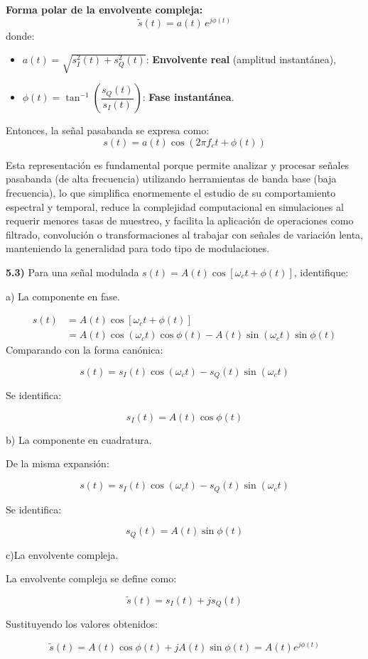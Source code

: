 \noindent \textbf{Forma polar de la envolvente compleja:}
\[
\tilde{s}(t) = a(t) \, e^{j \phi(t)}
\]
donde:
\begin{itemize}
    \item \( a(t) = \sqrt{s_I^2(t) + s_Q^2(t)} \): \textbf{Envolvente real} (amplitud instantánea),
    \item \( \phi(t) = \tan^{-1} \left( \dfrac{s_Q(t)}{s_I(t)} \right) \): \textbf{Fase instantánea}.
\end{itemize}
\noindent Entonces, la señal pasabanda se expresa como:
\[
s(t) = a(t) \cos \left( 2\pi f_c t + \phi(t) \right)
\]

\noindent Esta representación es fundamental porque permite analizar y procesar señales pasabanda (de alta frecuencia) utilizando herramientas de banda base (baja frecuencia), lo que simplifica enormemente el estudio de su comportamiento espectral y temporal, reduce la complejidad computacional en simulaciones al requerir menores tasas de muestreo, y facilita la aplicación de operaciones como filtrado, convolución o transformaciones al trabajar con señales de variación lenta, manteniendo la generalidad para todo tipo de modulaciones.
\bigskip

\noindent \textbf{5.3)} Para una señal modulada \(s(t) = A(t)\cos[\omega_c t + \phi(t)]\), identifique: \par

\noindent a) La componente en fase.\par
\bigskip

\begin{align*}
s(t) &= A(t) \cos[\omega_c t + \phi(t)] \\
     &= A(t) \cos(\omega_c t) \cos \phi(t) - A(t) \sin(\omega_c t) \sin \phi(t)
\end{align*}
Comparando con la forma canónica:

\[
s(t) = s_I(t) \cos(\omega_c t) - s_Q(t) \sin(\omega_c t)
\]

Se identifica:

\[
s_I(t) = A(t) \cos \phi(t)
\]
\bigskip

\noindent b) La componente en cuadratura. \par
\bigskip
De la misma expansión:

\[
s(t) = s_I(t) \cos(\omega_c t) - s_Q(t) \sin(\omega_c t)
\]

Se identifica:

\[
s_Q(t) = A(t) \sin \phi(t)
\]
\bigskip

\noindent c)La envolvente compleja.\par
\bigskip

La envolvente compleja se define como:

\[
\tilde{s}(t) = s_I(t) + j s_Q(t)
\]

Sustituyendo los valores obtenidos:

\[
\tilde{s}(t) = A(t) \cos \phi(t) + j A(t) \sin \phi(t) = A(t) e^{j\phi(t)}
\]

